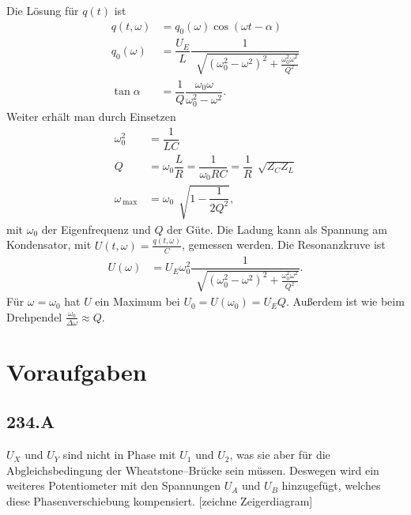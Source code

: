 \documentclass[a4paper,12pt]{article}
\numberwithin{equation}{section}
\begin{document}
Die Lösung für $q\left(t\right)$ ist
\begin{align} 
        q\left(t,\omega \right)&=q_0\left(\omega \right)\cos \left(\omega t-\alpha \right)\\
        q_0\left(\omega \right)&=\dfrac{U_E}{L}\dfrac{1}{\,\sqrt[]{\left(\omega _0^2-\omega ^2\right)^2+\tfrac{\omega _0^2\omega ^2}{Q^2} }}\\
        \tan \alpha &=\dfrac{1}{Q}\dfrac{\omega _0\omega }{\omega _0^2-\omega ^2}
.\end{align} 
Weiter erhält man durch Einsetzen
\begin{align} 
        \omega _0^2&=\dfrac{1}{LC}\\
        Q&=\omega _0\dfrac{L}{R}=\dfrac{1}{\omega _0RC}=\dfrac{1}{R}\,\sqrt[]{Z_CZ_L}\\
        \omega _{\,\text{max}\,}&=\omega _0\,\sqrt[]{1-\dfrac{1}{2Q^2}}
,\end{align} 
mit $\omega _0$ der Eigenfrequenz und $Q$ der Güte. Die Ladung kann als Spannung am Kondensator, mit $U\left(t,\omega \right)=\tfrac{q\left(t,\omega \right)}{C}$, gemessen werden. Die Resonanzkruve ist
\begin{align} 
        U\left(\omega \right)&=U_E\omega _0^2\dfrac{1}{\,\sqrt[]{\left(\omega _0^2-\omega ^2\right)^2+\tfrac{\omega _0^2\omega ^2}{Q^2}}}
.\end{align} 
Für $\omega =\omega _0$ hat $U$ ein Maximum bei $U_0=U\left(\omega _0\right)=U_EQ$. Außerdem ist wie beim Drehpendel $\tfrac{\omega _0}{\Delta \omega }\approx Q$.


\newpage
\section{Voraufgaben}
\subsection{234.A}
$U_X$ und $U_Y$ sind nicht in Phase mit $U_1$ und $U_2$, was sie aber für die Abgleichsbedingung der Wheatstone--Brücke sein müssen. Deswegen wird ein weiteres Potentiometer mit den Spannungen $U_A$ und $U_B$ hinzugefügt, welches diese Phasenverschiebung kompensiert. [zeichne Zeigerdiagram]
\end{document}
